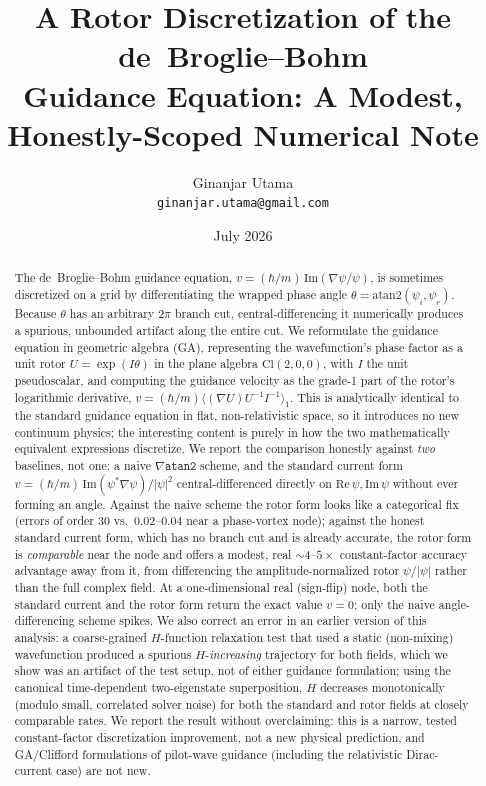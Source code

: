 \documentclass[11pt]{article}
\title{\Large A Rotor Discretization of the de~Broglie--Bohm\\ Guidance Equation: A Modest, Honestly-Scoped Numerical Note}
\author{Ginanjar Utama\\ \small \texttt{ginanjar.utama@gmail.com}}
\date{July 2026}
\newcommand{\Cl}{\mathrm{Cl}}
\begin{document}
\maketitle

\begin{abstract}
The de~Broglie--Bohm guidance equation, $v=(\hbar/m)\,\mathrm{Im}(\nabla\psi/\psi)$, is sometimes discretized on a grid by differentiating the wrapped phase angle $\theta=\mathrm{atan2}(\psi_i,\psi_r)$. Because $\theta$ has an arbitrary $2\pi$ branch cut, central-differencing it numerically produces a spurious, unbounded artifact along the entire cut. We reformulate the guidance equation in geometric algebra (GA), representing the wavefunction's phase factor as a unit rotor $U=\exp(I\theta)$ in the plane algebra $\Cl(2,0,0)$, with $I$ the unit pseudoscalar, and computing the guidance velocity as the grade-1 part of the rotor's logarithmic derivative, $v=(\hbar/m)\langle(\nabla U)U^{-1}I^{-1}\rangle_1$. This is analytically identical to the standard guidance equation in flat, non-relativistic space, so it introduces no new continuum physics; the interesting content is purely in how the two mathematically equivalent expressions discretize. We report the comparison honestly against \emph{two} baselines, not one: a naive $\nabla\mathtt{atan2}$ scheme, and the standard current form $v=(\hbar/m)\,\mathrm{Im}(\psi^*\nabla\psi)/|\psi|^2$ central-differenced directly on $\mathrm{Re}\,\psi,\mathrm{Im}\,\psi$ without ever forming an angle. Against the naive scheme the rotor form looks like a categorical fix (errors of order $30$ vs.\ $0.02$--$0.04$ near a phase-vortex node); against the honest standard current form, which has no branch cut and is already accurate, the rotor form is \emph{comparable} near the node and offers a modest, real $\sim\!4$--$5\times$ constant-factor accuracy advantage away from it, from differencing the amplitude-normalized rotor $\psi/|\psi|$ rather than the full complex field. At a one-dimensional real (sign-flip) node, both the standard current and the rotor form return the exact value $v=0$; only the naive angle-differencing scheme spikes. We also correct an error in an earlier version of this analysis: a coarse-grained $H$-function relaxation test that used a static (non-mixing) wavefunction produced a spurious $H$-\emph{increasing} trajectory for both fields, which we show was an artifact of the test setup, not of either guidance formulation; using the canonical time-dependent two-eigenstate superposition, $H$ decreases monotonically (modulo small, correlated solver noise) for both the standard and rotor fields at closely comparable rates. We report the result without overclaiming: this is a narrow, tested constant-factor discretization improvement, not a new physical prediction, and GA/Clifford formulations of pilot-wave guidance (including the relativistic Dirac-current case) are not new.
\end{abstract}
\end{document}
